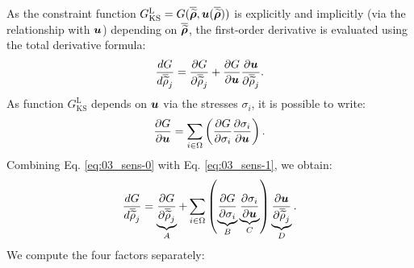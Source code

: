 As  the constraint function $G_{\text{KS}}^\text{L} = G(\bm{\overline{\widetilde{\rho}}}, \bm{u}(\bm{\overline{\widetilde{\rho}}}) )$ is explicitly and implicitly (via the relationship with $\bm{u}$) depending on $\bm{\overline{\widetilde{\rho}}}$, the first-order derivative is evaluated using the total derivative formula:
\begin{equation} \label{eq:03_sens-0}
    \frac{d G}{d \overline{\widetilde{\rho}}_j} = \frac{\partial G}{\partial \overline{\widetilde{\rho}}_j} + \frac{\partial G}{\partial\bm{u}} \frac{\partial\bm{u} }{\partial\overline{\widetilde{\rho}}_j}.
\end{equation}
As function $G_{\text{KS}}^\text{L}$ depends on $\bm{u}$ via the stresses $\sigma_i$, it is possible to write:
\begin{equation} \label{eq:03_sens-1}
    \frac{\partial G}{\partial\bm{u}} = \sum_{i \in \Omega} \left( \frac{\partial G}{\partial\sigma_i} \frac{\partial\sigma_i}{\partial\bm{u}}\right).
\end{equation}
Combining Eq. \ref{eq:03_sens-0} with Eq. \ref{eq:03_sens-1}, we obtain:
\begin{equation} \label{eq:03_sens-2}
    \frac{d G}{d \overline{\widetilde{\rho}}_j} = \underbrace{\frac{\partial G}{\partial\overline{\widetilde{\rho}}_j}}_A + \sum_{i \in \Omega} \left( \underbrace{\frac{\partial G}{\partial\sigma_i}}_B \underbrace{\frac{\partial\sigma_i}{\partial\bm{u}}}_C \right)  \underbrace{\frac{\partial\bm{u} }{\partial\overline{\widetilde{\rho}}_j}}_D.
\end{equation}
We compute the four factors separately:

